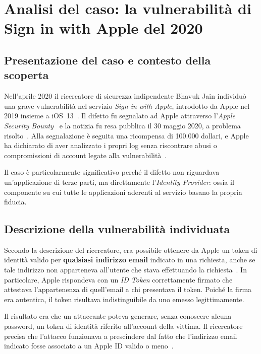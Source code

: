 \section{Analisi del caso: la vulnerabilità di Sign in with Apple del 2020}
\label{sec:analisi-tecnica}

\subsection{Presentazione del caso e contesto della scoperta}
Nell'aprile 2020 il ricercatore di sicurezza indipendente Bhavuk Jain individuò
una grave vulnerabilità nel servizio \emph{Sign in with Apple}, introdotto da
Apple nel 2019 insieme a iOS~13~\cite{apple-ios13-2019}. Il difetto fu segnalato ad Apple attraverso
l'\emph{Apple Security Bounty}~\cite{apple-bounty-2019} e la notizia fu resa
pubblica il 30 maggio 2020, a problema risolto~\cite{jain-apple-2020}.
Alla segnalazione è seguita una ricompensa di 100.000 dollari, e Apple ha dichiarato
di aver analizzato i propri log senza riscontrare abusi o compromissioni di
account legate alla vulnerabilità~\cite{jain-apple-2020,goodin2020}.

Il caso è particolarmente significativo perché il difetto non riguardava
un'applicazione di terze parti, ma direttamente l'\emph{Identity Provider}:
ossia il componente su cui tutte le applicazioni aderenti al servizio basano
la propria fiducia.

\subsection{Descrizione della vulnerabilità individuata}
Secondo la descrizione del ricercatore, era possibile ottenere da Apple un
token di identità valido per \textbf{qualsiasi indirizzo email} indicato in una
richiesta, anche se tale indirizzo non apparteneva all'utente che stava
effettuando la richiesta~\cite{jain-apple-2020}. In particolare, Apple
rispondeva con un \emph{ID Token} correttamente firmato che attestava
l'appartenenza di quell'email a chi presentava il token. Poiché la firma era
autentica, il token risultava indistinguibile da uno emesso legittimamente.

Il risultato era che un attaccante poteva generare, senza conoscere alcuna
password, un token di identità riferito all'account della vittima.
Il ricercatore precisa che l'attacco funzionava a prescindere dal fatto che
l'indirizzo email indicato fosse associato a un Apple ID valido o meno~\cite{jain-apple-2020}.

